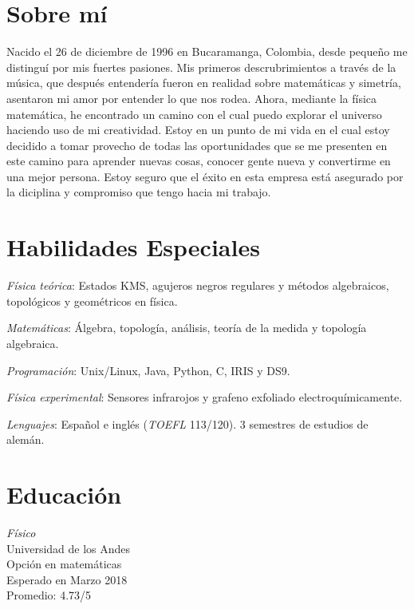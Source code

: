 \documentclass[line,margin]{res}
\begin{document}
\address{ivanmbur@gmail.com\\ Cr. 19 63 27, Bogotá, Colombia\\ (+57) 316 782 1110}

\begin{resume}

\section{Sobre mí}

Nacido el 26 de diciembre de 1996 en Bucaramanga, Colombia, desde pequeño me distinguí por mis fuertes pasiones. Mis primeros descrubrimientos a través de la música, que después entendería fueron en realidad sobre matemáticas y simetría, asentaron mi amor por entender lo que nos rodea. Ahora, mediante la física matemática, he encontrado un camino con el cual puedo explorar el universo haciendo uso de mi creatividad. Estoy en un punto de mi vida en el cual estoy decidido a tomar provecho de todas las oportunidades que se me presenten en este camino para aprender nuevas cosas, conocer gente nueva y convertirme en una mejor persona. Estoy seguro que el éxito en esta empresa está asegurado por la diciplina y compromiso que tengo hacia mi trabajo.

\section{Habilidades Especiales}

{\sl Física teórica}: Estados KMS, agujeros negros regulares y métodos algebraicos, topológicos y geométricos en física. 

{\sl Matemáticas}: Álgebra, topología, análisis, teoría de la medida y topología algebraica.

{\sl Programación}: Unix/Linux, Java, Python, C, IRIS y DS9.

{\sl Física experimental}: Sensores infrarojos y grafeno exfoliado electroquímicamente.  

{\sl Lenguajes}: Español e inglés ({\sl TOEFL} 113/120). 3 semestres de estudios de alemán.

\section{Educación}
{\sl Físico} \\
Universidad de los Andes \\
Opción en matemáticas \\
Esperado en Marzo 2018 \\
Promedio: 4.73/5


\end{resume}
\end{document}
